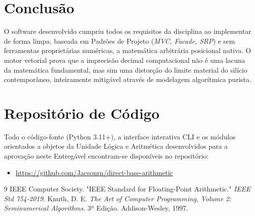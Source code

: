 \documentclass[12pt,a4paper]{article}
\begin{document}
\section{Conclusão}
O software desenvolvido cumpriu todos os requisitos da disciplina ao implementar de forma limpa, baseada em Padrões de Projeto (\textit{MVC, Facade, SRP}) e sem ferramentas proprietárias numéricas, a matemática arbitrária posicional nativa. O motor vetorial prova que a imprecisão decimal computacional não é uma lacuna da matemática fundamental, mas sim uma distorção do limite material do silício contemporâneo, inteiramente mitigável através de modelagem algorítmica purista.

\section{Repositório de Código}
Todo o código-fonte (Python 3.11+), a interface interativa CLI e os módulos orientados a objetos da Unidade Lógica e Aritmética desenvolvidos para a aprovação neste Entregável encontram-se disponíveis no repositório:
\begin{itemize}
    \item \url{https://github.com/Jacsonrn/direct-base-arithmetic}
\end{itemize}

\begin{thebibliography}{9}
 IEEE Computer Society. "IEEE Standard for Floating-Point Arithmetic." \textit{IEEE Std 754-2019}.
 Knuth, D. E. \textit{The Art of Computer Programming, Volume 2: Seminumerical Algorithms}. 3ª Edição. Addison-Wesley, 1997.
\end{thebibliography}
\end{document}

